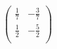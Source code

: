 \documentclass{article}
\begin{document}
\begin{enumerate}
    \begin{align*}
        \begin{pmatrix}
            \frac{1}{7} & -\frac{3}{7} \\
            \frac{1}{2} & -\frac{5}{2} \\
        \end{pmatrix}
    \end{align*}
\end{enumerate}
\end{document}
